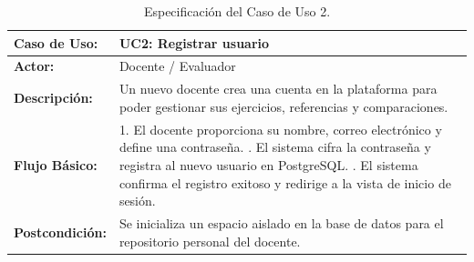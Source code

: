 \begin{table}[H]
	\centering
	\begin{tabular}{|p{3cm}|p{11cm}|}
		\hline
		\rowcolor[HTML]{E7F3FF}
		\textbf{Caso de Uso:}   & \textbf{UC2: Registrar usuario}                                                                                     \\ \hline
		\textbf{Actor:}         & Docente / Evaluador                                                                                                 \\ \hline
		\textbf{Descripción:}   & Un nuevo docente crea una cuenta en la plataforma para poder gestionar sus ejercicios, referencias y comparaciones. \\ \hline
		\textbf{Flujo Básico:}  &
		1. El docente proporciona su nombre, correo electrónico y define una contraseña. \newline
		2. El sistema cifra la contraseña y registra al nuevo usuario en PostgreSQL. \newline
		3. El sistema confirma el registro exitoso y redirige a la vista de inicio de sesión.                                                         \\ \hline
		\textbf{Postcondición:} & Se inicializa un espacio aislado en la base de datos para el repositorio personal del docente.                      \\ \hline
	\end{tabular}
	\caption{Especificación del Caso de Uso 2.}
\end{table}

